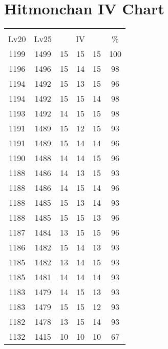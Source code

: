 \documentclass{article}%
\begin{document}
%
\normalsize%
\section{Hitmonchan IV Chart}%
\label{sec:Hitmonchan IV Chart}%
\renewcommand{\arraystretch}{1.5}%
\begin{tabular}{|c|c|c|c|c|c|}%
\hline%
\multicolumn{6}{|c|}{\textcolor{white}{ 
\linebreak{Hitmonchan}
}%
\cellcolor{black}}\\%
\multicolumn{1}{|c}{Lv20}&\multicolumn{1}{c|}{Lv25}&\multicolumn{3}{c|}{IV}&\multicolumn{1}{|c|}{\%}\\%
\hline%
\rowcolor{color100}%
1199&1499&15&15&15&100\\%
\hline%
\rowcolor{color98}%
1196&1496&15&14&15&98\\%
\hline%
\rowcolor{color96}%
1194&1492&15&13&15&96\\%
\hline%
\rowcolor{color98}%
1194&1492&15&15&14&98\\%
\hline%
\rowcolor{color98}%
1193&1492&14&15&15&98\\%
\hline%
\rowcolor{color93}%
1191&1489&15&12&15&93\\%
\hline%
\rowcolor{color96}%
1191&1489&15&14&14&96\\%
\hline%
\rowcolor{color96}%
1190&1488&14&14&15&96\\%
\hline%
\rowcolor{color93}%
1188&1486&14&13&15&93\\%
\hline%
\rowcolor{color96}%
1188&1486&14&15&14&96\\%
\hline%
\rowcolor{color93}%
1188&1485&15&13&14&93\\%
\hline%
\rowcolor{color96}%
1188&1485&15&15&13&96\\%
\hline%
\rowcolor{color96}%
1187&1484&13&15&15&96\\%
\hline%
\rowcolor{color93}%
1186&1482&15&14&13&93\\%
\hline%
\rowcolor{color93}%
1185&1482&13&14&15&93\\%
\hline%
\rowcolor{color93}%
1185&1481&14&14&14&93\\%
\hline%
\rowcolor{color93}%
1183&1479&14&15&13&93\\%
\hline%
\rowcolor{color93}%
1183&1479&15&15&12&93\\%
\hline%
\rowcolor{color93}%
1182&1478&13&15&14&93\\%
\hline%
\rowcolor{color91}%
1132&1415&10&10&10&67\\%
\end{tabular}

%
\end{document}
